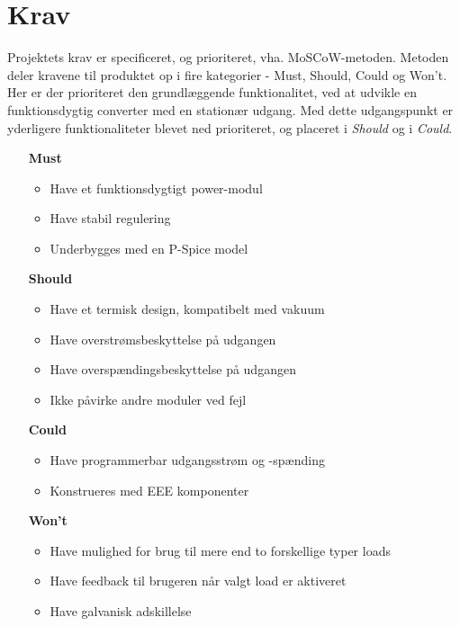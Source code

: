 
\chapter{Krav}
Projektets krav er specificeret, og prioriteret, vha. MoSCoW-metoden\cite{MoSCoW}. Metoden deler kravene til produktet op i fire kategorier - Must, Should, Could og Won't. Her er der prioriteret den grundlæggende funktionalitet, ved at udvikle en funktionsdygtig converter med en stationær udgang. Med dette udgangspunkt er yderligere funktionaliteter blevet ned prioriteret, og placeret i \textit{Should} og i \textit{Could}. 

\begin{itemize}
	\item[\textbf{Must}]
	\begin{itemize}
		\item Have et funktionsdygtigt power-modul
		\item Have stabil regulering
		\item Underbygges med en P-Spice model
		
	\end{itemize}
	\item[\textbf{Should}]
	\begin{itemize}
		\item Have et termisk design, kompatibelt med vakuum
		\item Have overstrømsbeskyttelse på udgangen
		\item Have overspændingsbeskyttelse på udgangen
		\item Ikke påvirke andre moduler ved fejl
		
	\end{itemize}
	\item[\textbf{Could}] 
	\begin{itemize}
		\item Have programmerbar udgangsstrøm og -spænding
		\item Konstrueres med EEE komponenter
		
	\end{itemize}
	\item[\textbf{Won't}]
	\begin{itemize}
		\item Have mulighed for brug til mere end to forskellige typer loads
		\item Have feedback til brugeren når valgt load er aktiveret
		\item Have galvanisk adskillelse
		
	\end{itemize}
\end{itemize}

